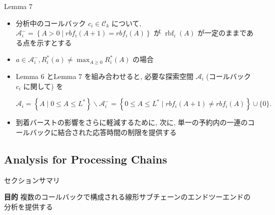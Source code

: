 \begin{frame}[label=lemma7]{Lemma 7}
    \begin{lemma}[]
        \begin{itemize}
            \item 分析中のコールバック $c_{i} \in \mathcal{C}_{k}$ について, $\mathcal{A}_{i}^{-}=\left\{A>0 \mid r b f_{i}(A+1)=r b f_{i}(A)\right\}$ が $\operatorname{rbf}_{i}(A)$ が一定のままである点を示すとする
\item $a \in \mathcal{A}_{i}^{-}, R_{i}^{*}(a) \neq \max _{A \geq 0} R_{i}^{*}(A)$ の場合
        \end{itemize}
    \end{lemma}
\end{frame}

\begin{frame}{}
    \begin{itemize}
        \item Lemma 6 とLemma 7 を組み合わせると, 必要な探索空間 $\mathcal{A}_{i}$ (コールバック $c_{i}$ に関して) を

              \begin{equation*}
                  \mathcal{A}_{i}=\left\{A \mid 0 \leq A \leq L^{*}\right\} \backslash \mathcal{A}_{i}^{-}=\left\{0 \leq A \leq L^{*} \mid r b f_{i}(A+1) \neq r b f_{i}(A)\right\} \cup\{0\} .
              \end{equation*}

        \item 到着バーストの影響をさらに軽減するために, 次に, 単一の予約内の一連のコールバックに結合された応答時間の制限を提供する
    \end{itemize}
\end{frame}


\subsection{Analysis for Processing Chains}
\label{ssec: analysis for processing chains}

\begin{frame}{セクションサマリ}
    \begin{itembox}[l]{\textbf{目的}}
        複数のコールバックで構成される線形サブチェーンのエンドツーエンドの分析を提供する
    \end{itembox}
\end{frame}

